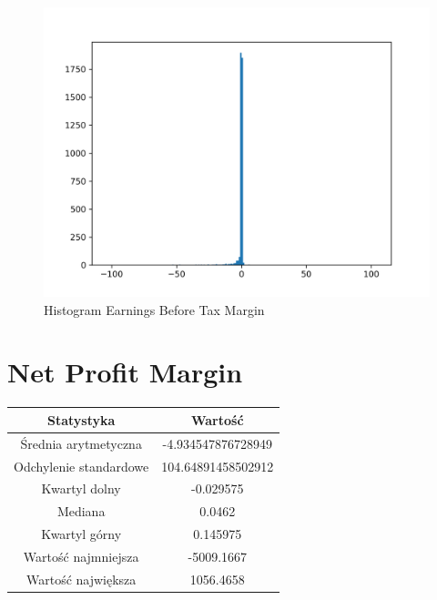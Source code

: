 \documentclass{article}
\begin{document}
\begin{figure}[h!]
    \includegraphics[width=\linewidth]{variables/Earnings Before Tax Margin.png}
    \caption{Histogram Earnings Before Tax Margin }
\end{figure}\section{ Net Profit Margin }

\begin{center}
    \begin{tabular}{|c | c|} 
    \hline
    Statystyka & Wartość \\
    \hline\hline
    Średnia arytmetyczna & -4.934547876728949 \\ 
    \hline
    Odchylenie standardowe & 104.64891458502912 \\
    \hline
    Kwartyl dolny & -0.029575 \\
    \hline
    Mediana & 0.0462 \\
    \hline
    Kwartyl górny & 0.145975 \\
    \hline
    Wartość najmniejsza & -5009.1667 \\
    \hline
    Wartość największa & 1056.4658 \\
    \hline
   \end{tabular}
\end{center}
\end{document}
